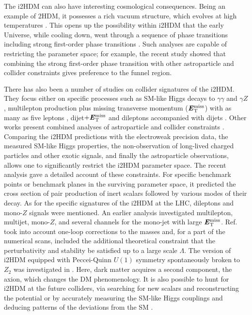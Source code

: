 \documentclass[12pt,a4paper]{article}
\newcommand{\MET}{\textbf{\textit{E}$_{\rm T}^{\rm miss}$}}
\begin{document}
The i2HDM can also have interesting cosmological consequences.
Being an example of 2HDM, it possesses a rich vacuum structure, which evolves at high temperatures 
\cite{Turok:1991uc,Cottingham:1995cj,Ginzburg:2009dp}.
This opens up the possibility within i2HDM that the early Universe, while cooling down, 
went through a sequence of phase transitions including strong first-order phase transitions 
\cite{Ginzburg:2010wa,Chowdhury:2011ga,Borah:2012pu,Gil:2012ya,Dorsch:2013wja,Cline:2013bln,Blinov:2015vma}.
Such analyses are capable of restricting the parameter space;
for example, the recent study \cite{Blinov:2015vma} showed that combining the strong 
first-order phase transition with other astroparticle and collider constraints gives preference to the funnel region.

There has also been a number of studies on collider signatures of the i2HDM. 
They focus either on specific processes such as SM-like Higgs decays to $\gamma\gamma$ and $\gamma Z$ 
\cite{Arhrib:2012ia,Swiezewska:2012eh,Krawczyk:2013jta,Krawczyk:2013pea},
multilepton production plus missing transverse momentum ($\MET{}$) \cite{Miao:2010rg,Gustafsson:2012aj,Hashemi:2016wup}
with as many as five leptons \cite{Datta:2016nfz},
dijet$+\MET{}$ \cite{Poulose:2016lvz} and dileptons accompanied with dijets \cite{Hashemi:2016wup}.
Other works present combined analyses of astroparticle and collider constraints 
\cite{Goudelis:2013uca,Arhrib:2013ela,Ilnicka:2015jba,Blinov:2015qva,Alves:2016bib,Datta:2016nfz}.
Comparing the i2HDM predictions with the electroweak precision data, 
the measured SM-like Higgs properties, the non-observation
of long-lived charged particles and other exotic signals, and finally the astroparticle
observations, allows one to significantly restrict the i2HDM parameter space.
The recent analysis \cite{Ilnicka:2015jba} gave a detailed account of these constraints.
For specific benchmark points or benchmark planes in the surviving parameter space, 
it predicted the cross section of pair production of inert scalars followed by various modes of their decay.
As for the specific signatures of the i2HDM at the LHC, dileptons and mono-$Z$ signals were mentioned.
An earlier analysis \cite{Arhrib:2013ela} investigated multilepton, multijet, mono-$Z$,
and several channels for the mono-jet with large $\MET{}$.
Ref.~\cite{Goudelis:2013uca} took into account one-loop corrections to the masses
and, for a part of the numerical scans, included the additional theoretical constraint that 
the perturbativity and stability be satisfied up to a large scale $\Lambda$.
The version of i2HDM equipped with Peccei-Quinn $U(1)$ symmetry spontaneously broken to $Z_2$ 
was investigated in \cite{Alves:2016bib}. Here, dark matter acquires a second component, the axion, 
which changes the DM phenomenology.
It is also possible to hunt for i2HDM at the future colliders, via searching for new scalars
and reconstructing the potential \cite{Aoki:2013lhm} or by accurately measuring the SM-like Higgs couplings
and deducing patterns of the deviations from the SM \cite{Kanemura:2016sos}.
\end{document}
